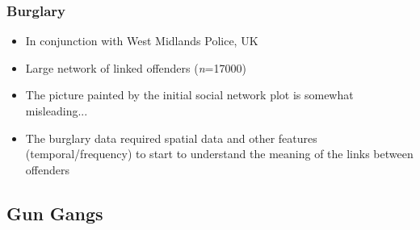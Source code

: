 \documentclass[pdftex]{beamer}
\begin{document}
\begin{frame}
\frametitle{Burglary}
\begin{itemize}
\item In conjunction with West Midlands Police, UK
\item Large network of linked offenders ({\emph{n}}=17000)
\item The picture painted by the initial social network plot is
somewhat misleading...
\item The burglary data required spatial data and other features (temporal/frequency) to
  start to understand the meaning of the links between
  offenders
\end{itemize}
\end{frame}

\subsection{Gun Gangs}

{ %
    \begin{frame}[plain]
     \end{frame}
}
\end{document}
